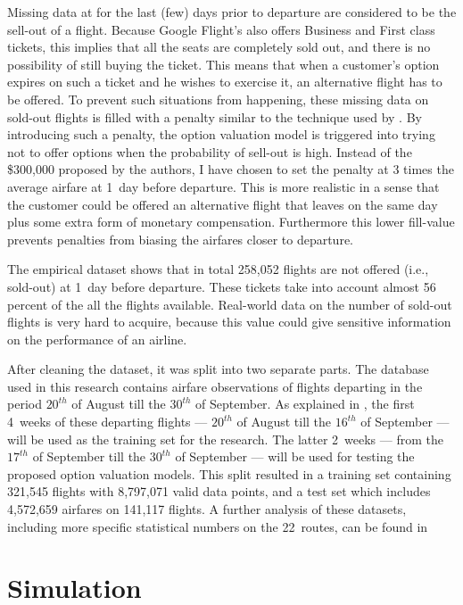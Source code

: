 
Missing data at for the last (few) days prior to departure are considered to be the sell-out of a flight. Because Google Flight's also offers Business and First class tickets, this implies that all the seats are completely sold out, and there is no possibility of still buying the ticket. This means that when a customer's option expires on such a ticket and he wishes to exercise it, an alternative flight has to be offered. To prevent such situations from happening, these missing data on sold-out flights is filled with a penalty similar to the technique used by . By introducing such a penalty, the option valuation model is triggered into trying not to offer options when the probability of sell-out is high. Instead of the \$300,000 proposed by the authors, I have chosen to set the penalty at 3 times the average airfare at 1~day before departure. This is more realistic in a sense that the customer could be offered an alternative flight that leaves on the same day plus some extra form of monetary compensation. Furthermore this lower fill-value prevents penalties from biasing the airfares closer to departure.

The empirical dataset shows that in total 258,052 flights are not offered (i.e., sold-out) at 1~day before departure. These tickets take into account almost 56 percent of the all the flights available. Real-world data on the number of sold-out flights is very hard to acquire, because this value could give sensitive information on the performance of an airline.  

After cleaning the dataset, it was split into two separate parts. The database used in this research contains airfare observations of flights departing in the period $20^{th}$ of August till the $30^{th}$ of September. As explained in , the first 4~weeks of these departing flights --- $20^{th}$ of August till the $16^{th}$ of September --- will be used as the training set for the research. The latter 2~weeks --- from the $17^{th}$ of September till the $30^{th}$ of September --- will be used for testing the proposed option valuation models. This split resulted in a training set containing 321,545 flights with 8,797,071 valid data points, and a test set which includes 4,572,659 airfares on 141,117 flights. A further analysis of these datasets, including more specific statistical numbers on the 22~routes, can be found in 



\section{Simulation}





